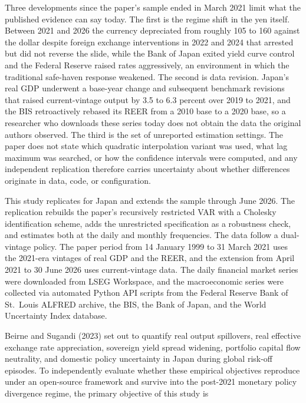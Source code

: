 Three developments since the paper's sample ended in March 2021 limit what the published evidence can say today. The first is the regime shift in the yen itself. Between 2021 and 2026 the currency depreciated from roughly 105 to 160 against the dollar despite foreign exchange interventions in 2022 and 2024 that arrested but did not reverse the slide, while the Bank of Japan exited yield curve control and the Federal Reserve raised rates aggressively, an environment in which the traditional safe-haven response weakened. The second is data revision. Japan's real GDP underwent a base-year change and subsequent benchmark revisions that raised current-vintage output by 3.5 to 6.3 percent over 2019 to 2021, and the BIS retroactively rebased its REER from a 2010 base to a 2020 base, so a researcher who downloads these series today does not obtain the data the original authors observed. The third is the set of unreported estimation settings. The paper does not state which quadratic interpolation variant was used, what lag maximum was searched, or how the confidence intervals were computed, and any independent replication therefore carries uncertainty about whether differences originate in data, code, or configuration.

This study replicates \textcite{beirne_sugandi_2023} for Japan and extends the sample through June 2026. The replication rebuilds the paper's recursively restricted VAR with a Cholesky identification scheme, adds the unrestricted specification as a robustness check, and estimates both at the daily and monthly frequencies. The data follow a dual-vintage policy. The paper period from 14 January 1999 to 31 March 2021 uses the 2021-era vintages of real GDP and the REER, and the extension from April 2021 to 30 June 2026 uses current-vintage data. The daily financial market series were downloaded from LSEG Workspace, and the macroeconomic series were collected via automated Python API scripts from the Federal Reserve Bank of St.\ Louis ALFRED archive, the BIS, the Bank of Japan, and the World Uncertainty Index database.

Beirne and Sugandi (2023) set out to quantify real output spillovers, real effective exchange rate appreciation, sovereign yield spread widening, portfolio capital flow neutrality, and domestic policy uncertainty in Japan during global risk-off episodes. To independently evaluate whether these empirical objectives reproduce under an open-source framework and survive into the post-2021 monetary policy divergence regime, the primary objective of this study is

